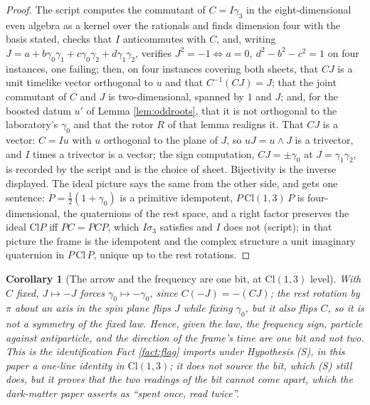 \documentclass[11pt]{article}
\newtheorem{corollary}[theorem]{Corollary}
\theoremstyle{definition}
\newcommand{\Cl}{\mathrm{Cl}}
\begin{document}
\begin{proof}
The script computes the commutant of $C = I\gamma_{3}$ in the eight-dimensional even algebra as a kernel over the rationals and finds dimension four with the basis stated, checks that $I$ anticommutes with $C$, and, writing $J = a + b\gamma_{0}\gamma_{1} + c\gamma_{0}\gamma_{2} + d\gamma_{1}\gamma_{2}$, verifies $J^{2} = -1 \iff a = 0,\ d^{2} - b^{2} - c^{2} = 1$ on four instances, one failing; then, on four instances covering both sheets, that $CJ$ is a unit timelike vector orthogonal to $u$ and that $C^{-1}(CJ) = J$; that the joint commutant of $C$ and $J$ is two-dimensional, spanned by $1$ and $J$; and, for the boosted datum $u'$ of Lemma \ref{lem:oddroots}, that it is not orthogonal to the laboratory's $\gamma_{0}$ and that the rotor $R$ of that lemma realigns it. That $CJ$ is a vector: $C = Iu$ with $u$ orthogonal to the plane of $J$, so $uJ = u \wedge J$ is a trivector, and $I$ times a trivector is a vector; the sign computation, $CJ = \pm\gamma_{0}$ at $J = \gamma_{1}\gamma_{2}$, is recorded by the script and is the choice of sheet. Bijectivity is the inverse displayed. The ideal picture says the same from the other side, and gets one sentence: $P = \tfrac12(1 + \gamma_{0})$ is a primitive idempotent, $P\,\Cl(1,3)\,P$ is four-dimensional, the quaternions of the rest space, and a right factor preserves the ideal $\Cl P$ iff $PC = PCP$, which $I\sigma_{3}$ satisfies and $I$ does not (script); in that picture the frame is the idempotent and the complex structure a unit imaginary quaternion in $P\,\Cl\,P$, unique up to the rest rotations.
\end{proof}

\begin{corollary}[The arrow and the frequency are one bit, at $\Cl(1,3)$ level]\label{cor:onebit}
With $C$ fixed, $J \mapsto -J$ forces $\gamma_{0} \mapsto -\gamma_{0}$, since $C(-J) = -(CJ)$; the rest rotation by $\pi$ about an axis in the spin plane flips $J$ while fixing $\gamma_{0}$, but it also flips $C$, so it is not a symmetry of the fixed law. Hence, given the law, the frequency sign, particle against antiparticle, and the direction of the frame's time are one bit and not two. This is the identification Fact \ref{fact:flag} imports under Hypothesis (S), in this paper a one-line identity in $\Cl(1,3)$; it does not source the bit, which (S) still does, but it proves that the two readings of the bit cannot come apart, which the dark-matter paper asserts as ``spent once, read twice''.
\end{corollary}
\end{document}
